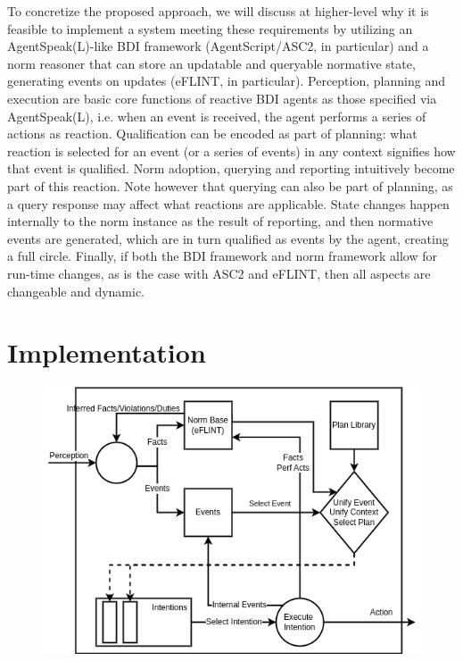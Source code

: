 
To concretize the proposed approach, we will discuss at higher-level why it is feasible to implement a system meeting these requirements by utilizing an AgentSpeak(L)-like BDI framework (AgentScript/ASC2, in particular) and a norm reasoner that can store an updatable and queryable normative state, generating events on updates (eFLINT, in particular). Perception, planning and execution are basic core functions of reactive BDI agents as those specified via AgentSpeak(L), i.e. when an event is received, the agent performs a series of actions as reaction. Qualification can be encoded as part of planning: what reaction is selected for an event (or a series of events) in any context signifies how that event is qualified. Norm adoption, querying and reporting intuitively become part of this reaction. Note however that querying can also be part of planning, as a query response may affect what reactions are applicable. State changes happen internally to the norm instance as the result of reporting, and then normative events are generated, which are in turn qualified as events by the agent, creating a full circle. Finally, if both the BDI framework and norm framework allow for run-time changes, as is the case with ASC2 and eFLINT, then all aspects are changeable and dynamic. 
%

\section{Implementation}
\label{sec:impl}
\label{sec:implementation}
\begin{figure}[t]
\centering
\begin{minipage}[b]{.7\linewidth}
  \centering
  \includegraphics[width=\textwidth]{ch_eumas/nbdiarch.drawio.png}
  \label{fig:nbdi}
\end{minipage}
\end{figure}
%

